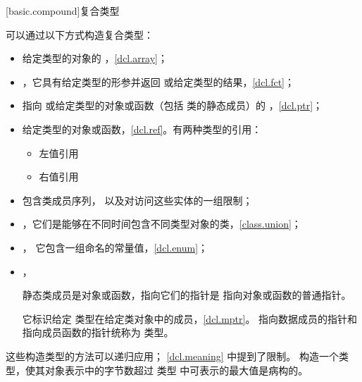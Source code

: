 [basic.compound]{复合类型}

\pnum
{}%
可以通过以下方式构造复合类型：
\begin{itemize}
\item 给定类型的对象的 ，\ref{dcl.array}；

\item {}，它具有给定类型的形参并返回
 或给定类型的结果，\ref{dcl.fct}；

\item 指向 \cv {} 或给定类型的对象或函数（包括
类的静态成员）的 ，\ref{dcl.ptr}；

\item
{}%
%
 给定类型的对象或函数，\ref{dcl.ref}。有两种类型的引用：
\begin{itemize}
\item 左值引用
\item 右值引用
\end{itemize}

\item
{} 包含类成员序列，
以及对访问这些实体的一组限制；

\item
{}，它们是能够在不同时间包含不同类型对象的类，\ref{class.union}；

\item
{}，
它包含一组命名的常量值，\ref{dcl.enum}；

\item
{}%
，%
\begin{footnote}
静态类成员是对象或函数，指向它们的指针是
指向对象或函数的普通指针。
\end{footnote}
它标识给定
类型在给定类对象中的成员，\ref{dcl.mptr}。
指向数据成员的指针和指向成员函数的指针统称为
 类型。
\end{itemize}

\pnum
这些构造类型的方法可以递归应用；
\ref{dcl.meaning} 中提到了限制。
构造一个类型，使其对象表示中的字节数超过
类型  中可表示的最大值是病构的。

